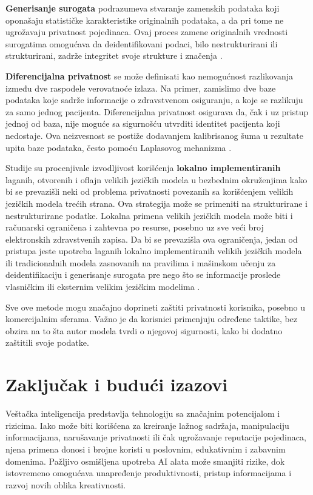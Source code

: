 \documentclass[a4paper,12pt]{article}
\begin{document}
\textbf{Generisanje surogata} podrazumeva stvaranje zamenskih podataka koji oponašaju statističke karakteristike originalnih podataka, a da pri tome ne ugrožavaju privatnost pojedinaca. Ovaj proces zamene originalnih vrednosti surogatima omogućava da deidentifikovani podaci, bilo nestrukturirani ili strukturirani, zadrže integritet svoje strukture i značenja \cite{nature_privacy_llm}.

\textbf{Diferencijalna privatnost} se može definisati kao nemogućnost razlikovanja između dve raspodele verovatnoće izlaza. Na primer, zamislimo dve baze podataka koje sadrže informacije o zdravstvenom osiguranju, a koje se razlikuju za samo jednog pacijenta. Diferencijalna privatnost osigurava da, čak i uz pristup jednoj od baza, nije moguće sa sigurnošću utvrditi identitet pacijenta koji nedostaje. Ova neizvesnost se postiže dodavanjem kalibrisanog šuma u rezultate upita baze podataka, često pomoću Laplasovog mehanizma \cite{nature_privacy_llm}.

Studije su procenjivale izvodljivost korišćenja \textbf{lokalno implementiranih} laganih, otvorenih i oflajn velikih jezičkih modela u bezbednim okruženjima kako bi se prevazišli neki od problema privatnosti povezanih sa korišćenjem velikih jezičkih modela trećih strana. Ova strategija može se primeniti na strukturirane i nestrukturirane podatke. Lokalna primena velikih jezičkih modela može biti i računarski ograničena i zahtevna po resurse, posebno uz sve veći broj elektronskih zdravstvenih zapisa. Da bi se prevazišla ova ograničenja, jedan od pristupa jeste upotreba laganih lokalno implementiranih velikih jezičkih modela ili tradicionalnih modela zasnovanih na pravilima i mašinskom učenju za deidentifikaciju i generisanje surogata pre nego što se informacije proslede vlasničkim ili eksternim velikim jezičkim modelima \cite{nature_privacy_llm}.

Sve ove metode mogu značajno doprineti zaštiti privatnosti korisnika, posebno u komercijalnim sferama. Važno je da korisnici primenjuju određene taktike, bez obzira na to šta autor modela tvrdi o njegovoj sigurnosti, kako bi dodatno zaštitili svoje podatke.

\section{Zaključak i budući izazovi}

Veštačka inteligencija predstavlja tehnologiju sa značajnim potencijalom i rizicima. Iako može biti korišćena za kreiranje lažnog sadržaja, manipulaciju informacijama, narušavanje privatnosti ili čak ugrožavanje reputacije pojedinaca, njena primena donosi i brojne koristi u poslovnim, edukativnim i zabavnim domenima. Pažljivo osmišljena upotreba AI alata može smanjiti rizike, dok istovremeno omogućava unapređenje produktivnosti, pristup informacijama i razvoj novih oblika kreativnosti.
\end{document}
